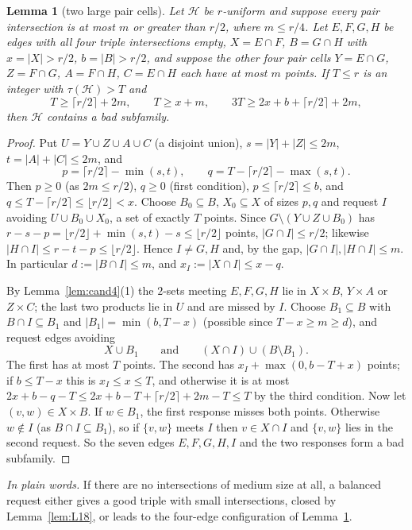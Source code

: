 \documentclass[11pt]{amsart}
\newtheorem{lemma}[theorem]{Lemma}
\theoremstyle{definition}
\theoremstyle{remark}
\newcommand{\cH}{\mathcal H}
\newcommand{\ceil}[1]{\lceil #1\rceil}
\newcommand{\floor}[1]{\lfloor #1\rfloor}
\begin{document}
\begin{lemma}[two large pair cells]\label{lem:L41}
Let $\cH$ be $r$-uniform and suppose every pair intersection is at most $m$ or greater than $r/2$, where $m\le r/4$. Let $E,F,G,H$ be edges with all four triple intersections empty, $X=E\cap F$, $B=G\cap H$ with $x=|X|>r/2$, $b=|B|>r/2$, and suppose the other four pair cells $Y=E\cap G$, $Z=F\cap G$, $A=F\cap H$, $C=E\cap H$ each have at most $m$ points. If $T\le r$ is an integer with $\tau(\cH)>T$ and
\[
T\ge\ceil{r/2}+2m,\qquad T\ge x+m,\qquad 3T\ge2x+b+\ceil{r/2}+2m,
\]
then $\cH$ contains a bad subfamily.
\end{lemma}
\begin{proof}
Put $U=Y\cup Z\cup A\cup C$ (a disjoint union), $s=|Y|+|Z|\le2m$, $t=|A|+|C|\le2m$, and
\[
p=\ceil{r/2}-\min(s,t),\qquad q=T-\ceil{r/2}-\max(s,t).
\]
Then $p\ge0$ (as $2m\le r/2$), $q\ge0$ (first condition), $p\le\ceil{r/2}\le b$, and $q\le T-\ceil{r/2}\le\floor{r/2}<x$. Choose $B_0\subseteq B$, $X_0\subseteq X$ of sizes $p,q$ and request $I$ avoiding $U\cup B_0\cup X_0$, a set of exactly $T$ points. Since $G\setminus(Y\cup Z\cup B_0)$ has $r-s-p=\floor{r/2}+\min(s,t)-s\le\floor{r/2}$ points, $|G\cap I|\le r/2$; likewise $|H\cap I|\le r-t-p\le\floor{r/2}$. Hence $I\ne G,H$ and, by the gap, $|G\cap I|,|H\cap I|\le m$. In particular $d:=|B\cap I|\le m$, and $x_I:=|X\cap I|\le x-q$.

By Lemma~\ref{lem:cand4}(1) the $2$-sets meeting $E,F,G,H$ lie in $X\times B$, $Y\times A$ or $Z\times C$; the last two products lie in $U$ and are missed by $I$. Choose $B_1\subseteq B$ with $B\cap I\subseteq B_1$ and $|B_1|=\min(b,T-x)$ (possible since $T-x\ge m\ge d$), and request edges avoiding
\[
X\cup B_1\qquad\text{and}\qquad (X\cap I)\cup(B\setminus B_1).
\]
The first has at most $T$ points. The second has $x_I+\max(0,b-T+x)$ points; if $b\le T-x$ this is $x_I\le x\le T$, and otherwise it is at most $2x+b-q-T\le 2x+b-T+\ceil{r/2}+2m-T\le T$ by the third condition. Now let $(v,w)\in X\times B$. If $w\in B_1$, the first response misses both points. Otherwise $w\notin I$ (as $B\cap I\subseteq B_1$), so if $\{v,w\}$ meets $I$ then $v\in X\cap I$ and $\{v,w\}$ lies in the second request. So the seven edges $E,F,G,H,I$ and the two responses form a bad subfamily.
\end{proof}

\noindent\emph{In plain words.} If there are no intersections of medium size at all, a balanced request either gives a good triple with small intersections, closed by Lemma~\ref{lem:L18}, or leads to the four-edge configuration of Lemma~\ref{lem:L41}.
\end{document}
